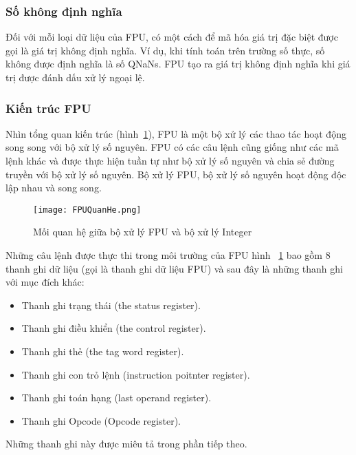 		\subsubsection*{Số không định nghĩa}
		Đối với mỗi loại dữ liệu của FPU, có một cách để mã hóa giá trị đặc biệt được gọi là giá trị không định nghĩa. Ví dụ, khi tính toán trên trường số thực, số không được định nghĩa là số QNaNs. FPU tạo ra giá trị không định nghĩa khi giá trị được đánh dấu xử lý ngoại lệ.
		
		\subsubsection{Kiến trúc FPU}
		Nhìn tổng quan kiến trúc (hình~\ref{fig:FPUQuanHe}), FPU là một bộ xử lý các thao tác hoạt động song song với bộ xử lý số nguyên. FPU có các câu lệnh cũng giống như các mã lệnh khác và được thực hiện tuần tự như bộ xử lý số nguyên và chia sẻ đường truyền với bộ xử lý số nguyên. Bộ xử lý FPU, bộ xử lý số nguyên hoạt động độc lập nhau và song song. 
		
		\begin{center}
			\begin{figure}[htp]
				\begin{center}
					\texttt{[image: FPUQuanHe.png]}
				\end{center}
				\caption{Mối quan hệ giữa bộ xử lý FPU và bộ xử lý Integer}				
				\label{fig:FPUQuanHe}				
			\end{figure}
		\end{center}		
		
		\newpage
		Những câu lệnh được thực thi trong môi trường của FPU hình ~\ref{fig:FPUQuanHe} bao gồm 8 thanh ghi dữ liệu (gọi là thanh ghi dữ liệu FPU) và sau đây là những thanh ghi với mục đích khác:
		\begin{itemize}
			\renewcommand{\labelitemi}{\textbullet}	
			\item	Thanh ghi trạng thái (the status register).
			\item	Thanh ghi điều khiển (the control register).
			\item	Thanh ghi thẻ (the tag word register).
			\item	Thanh ghi con trỏ lệnh (instruction poitnter register).
			\item	Thanh ghi toán hạng (last operand register).
			\item	Thanh ghi Opcode (Opcode register).
		\end{itemize}
		
	Những thanh ghi này được miêu tả trong phần tiếp theo.
	
